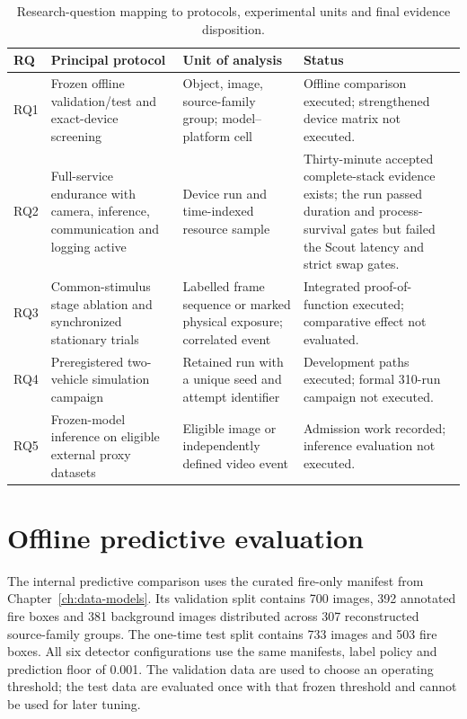 \begin{table}[H]
  \centering
  \caption{Research-question mapping to protocols, experimental units and
  final evidence disposition.}
  \label{tab:rq-method-map}
  \scriptsize
  \begin{tabularx}{\textwidth}{@{}p{}p{}p{}X@{}}
    \toprule
    RQ & Principal protocol & Unit of analysis & Status \\
    \midrule
    RQ1 & Frozen offline validation/test and exact-device screening & Object,
    image, source-family group; model--platform cell & Offline comparison
    executed; strengthened device matrix not executed. \\
    RQ2 & Full-service endurance with camera, inference, communication and
    logging active & Device run and time-indexed resource sample & Thirty-minute
    accepted complete-stack evidence exists; the run passed duration and
    process-survival gates but failed the Scout latency and strict swap gates. \\
    RQ3 & Common-stimulus stage ablation and synchronized stationary trials &
    Labelled frame sequence or marked physical exposure; correlated event &
    Integrated proof-of-function executed; comparative effect not evaluated. \\
    RQ4 & Preregistered two-vehicle simulation campaign & Retained run with a
    unique seed and attempt identifier & Development paths executed; formal
    310-run campaign not executed. \\
    RQ5 & Frozen-model inference on eligible external proxy datasets & Eligible
    image or independently defined video event & Admission work recorded;
    inference evaluation not executed. \\
    \bottomrule
  \end{tabularx}
\end{table}

\section{Offline predictive evaluation}
\label{sec:methodology:2}

The internal predictive comparison uses the curated fire-only manifest from
Chapter~\ref{ch:data-models}. Its validation split contains 700 images,
392 annotated fire boxes and 381 background images distributed across 307
reconstructed source-family groups. The one-time test split contains 733
images and 503 fire boxes. All six detector configurations use the same
manifests, label policy and prediction floor of 0.001. The validation data are
used to choose an operating threshold; the test data are evaluated once with
that frozen threshold and cannot be used for later tuning.

